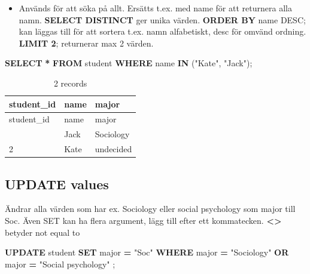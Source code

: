 \documentclass[
]{article}
\newenvironment{Shaded}{\begin{snugshade}}{\end{snugshade}}
\newcommand{\KeywordTok}[1]{\textcolor[rgb]{0.13,0.29,0.53}{\textbf{#1}}}
\newcommand{\NormalTok}[1]{#1}
\newcommand{\OperatorTok}[1]{\textcolor[rgb]{0.81,0.36,0.00}{\textbf{#1}}}
\newcommand{\OtherTok}[1]{\textcolor[rgb]{0.56,0.35,0.01}{#1}}
\providecommand{\tightlist}{%
  \setlength{\itemsep}{0pt}\setlength{\parskip}{0pt}}
\begin{document}
\begin{itemize}
\tightlist
\item
  Används för att söka på allt. Ersätts t.ex. med name för att returnera
  alla namn. \textbf{SELECT DISTINCT} ger unika värden. \textbf{ORDER
  BY} name DESC; kan läggas till för att sortera t.ex. namn alfabetiskt,
  desc för omvänd ordning. \textbf{LIMIT 2}; returnerar max 2 värden.
\end{itemize}

\begin{Shaded}
\begin{Highlighting}[]
\KeywordTok{SELECT} \OperatorTok{*} 
\KeywordTok{FROM}\NormalTok{ student}
\KeywordTok{WHERE}\NormalTok{ name }\KeywordTok{IN}\NormalTok{ (}\OtherTok{"Kate"}\NormalTok{, }\OtherTok{"Jack"}\NormalTok{);}
\end{Highlighting}
\end{Shaded}

\begin{longtable}[]{@{}lll@{}}
\caption{2 records}\tabularnewline
\toprule\noalign{}
student\_id & name & major \\
\midrule\noalign{}
\endfirsthead
\toprule\noalign{}
student\_id & name & major \\
\midrule\noalign{}
\endhead
\bottomrule\noalign{}
\endlastfoot
1 & Jack & Sociology \\
2 & Kate & undecided \\
\end{longtable}

\subsection{UPDATE values}\label{update-values}

Ändrar alla värden som har ex. Sociology eller social psychology som
major till Soc. Även SET kan ha flera argument, lägg till efter ett
kommatecken. \textbf{\textless\textgreater{}} betyder not equal to

\begin{Shaded}
\begin{Highlighting}[]
\KeywordTok{UPDATE}\NormalTok{ student}
\KeywordTok{SET}\NormalTok{ major }\OperatorTok{=} \OtherTok{"Soc"}
\KeywordTok{WHERE}\NormalTok{ major }\OperatorTok{=} \OtherTok{"Sociology"} \KeywordTok{OR}\NormalTok{ major }\OperatorTok{=} \OtherTok{"Social psychology"}\NormalTok{ ;}
\end{Highlighting}
\end{Shaded}
\end{document}
